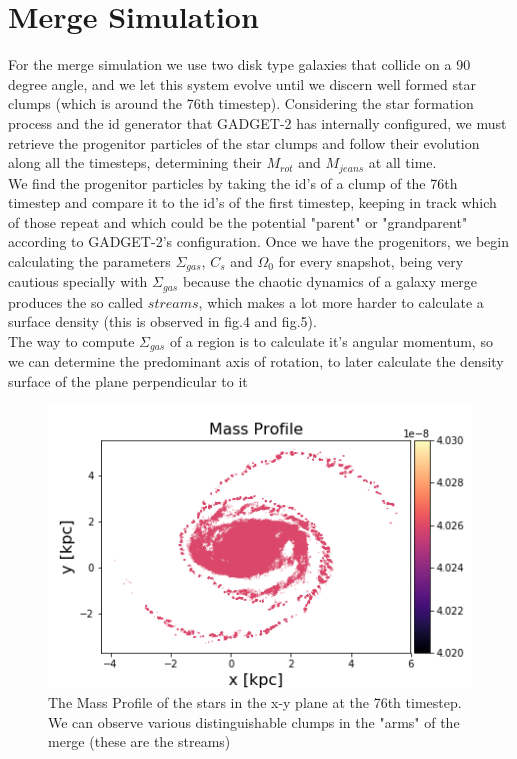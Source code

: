 \documentclass{aa}
\begin{document}
   \section{Merge Simulation}
   For the merge simulation we use two disk type galaxies that collide on a 90 degree angle, and we let this system evolve until we discern well formed star clumps (which is around the 76th timestep). Considering the star formation process and the id generator that GADGET-2 has internally configured, we must retrieve the progenitor particles of the star clumps and follow their evolution along all the timesteps, determining their $M_{rot}$ and $M_{jeans}$ at all time. \\
   We find the progenitor particles by taking the id's of a clump of the 76th timestep and compare it to the id's of the first timestep, keeping in track which of those repeat and which could be the potential "parent" or "grandparent" according to GADGET-2's configuration.  
   Once we have the progenitors, we begin calculating the parameters $\Sigma_{gas}$, $C_s$ and $\Omega_0$ for every snapshot, being very cautious specially with  $\Sigma_{gas}$ because the chaotic dynamics of a galaxy merge produces the so called $streams$, which makes a lot more harder to calculate a surface density (this is observed in fig.4 and fig.5). \\
   The way to compute $\Sigma_{gas}$ of a region is to calculate it's angular momentum, so we can determine the predominant axis of rotation, to later calculate the density surface of the plane perpendicular to it
   \begin{figure}[h!]
   \includegraphics[scale=0.55]{Distribution_masa.png}
   \caption{The Mass Profile of the stars in the x-y plane at the 76th timestep. We can observe various distinguishable clumps in the "arms" of the merge (these are the streams)}
   \centering
   \label{fig:boat1}
   \end{figure}
\end{document}
